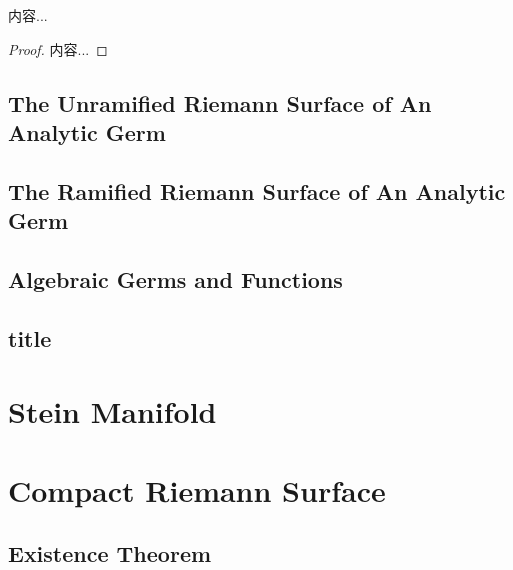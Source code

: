 \documentclass[Total.tex]{subfiles}
\begin{document}
			\begin{corollary}
				内容...
			\end{corollary}
			\begin{proof}
				内容...
			\end{proof}
			
			\section{The Unramified Riemann Surface of An Analytic Germ}
			\section{The Ramified Riemann Surface of An Analytic Germ}
			\section{Algebraic Germs and Functions}
			\section{title}
	\chapter{Stein Manifold}
	\chapter{Compact Riemann Surface}
		\section{Existence Theorem}
\end{document}
